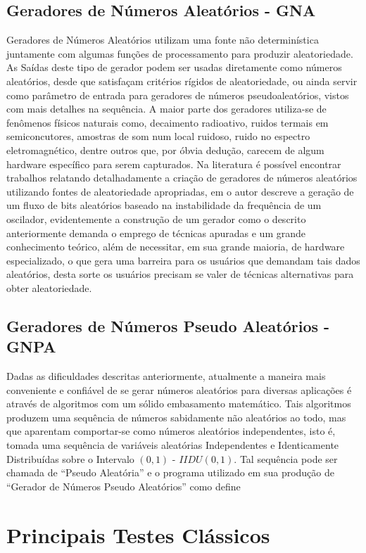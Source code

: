  \subsection{Geradores de Números Aleatórios - GNA}
  Geradores de Números Aleatórios utilizam uma fonte não determinística juntamente com algumas funções de processamento para produzir aleatoriedade. As Saídas deste tipo de gerador podem ser usadas diretamente como números aleatórios, desde que satisfaçam critérios rígidos de aleatoriedade, ou ainda servir como parâmetro de entrada para geradores de números pseudoaleatórios, vistos com mais detalhes na sequência. A maior parte dos geradores utiliza-se de fenômenos físicos naturais como, decaimento radioativo, ruidos termais em semiconcutores, amostras de som num local ruidoso, ruido no espectro eletromagnético, dentre outros que, por óbvia dedução, carecem de algum hardware específico para serem capturados. Na literatura é possível encontrar trabalhos relatando detalhadamente a criação de geradores de números aleatórios utilizando fontes de aleatoriedade apropriadas, em \citep{Fairfield:85} o autor descreve a geração de um fluxo de bits aleatórios baseado na instabilidade da frequência de um oscilador, evidentemente a construção de um gerador como o descrito anteriormente demanda o emprego de técnicas apuradas e um grande conhecimento teórico, além de necessitar, em sua grande maioria, de hardware especializado, o que gera uma barreira para os usuários que demandam tais dados aleatórios, desta sorte os usuários precisam se valer de técnicas alternativas para obter aleatoriedade.
  \subsection{Geradores de Números Pseudo Aleatórios - GNPA}
  Dadas as dificuldades descritas anteriormente, atualmente a maneira mais conveniente e confiável de se gerar números aleatórios para diversas aplicações é através de algoritmos com um sólido embasamento matemático. Tais algoritmos produzem uma sequência de números sabidamente não aleatórios ao todo, mas que aparentam comportar-se como números aleatórios independentes, isto é, tomada uma sequência de variáveis aleatórias Independentes e Identicamente Distribuídas sobre o Intervalo $(0,1)$ - $IID U(0,1)$. Tal sequência pode ser chamada de ``Pseudo Aleatória'' e o programa utilizado em sua produção de ``Gerador de Números Pseudo Aleatórios'' como define \citep{LEcuyer:98}

\section{Principais Testes Clássicos} %

